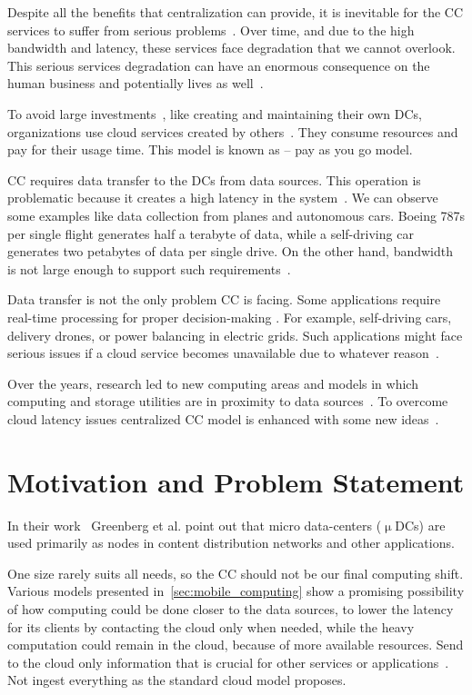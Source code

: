 Despite all the benefits that centralization can provide, it is inevitable for the CC services to suffer from serious problems~\cite{KarimIWGSYO16}. Over time, and due to the high bandwidth and latency, these services face degradation that we cannot overlook. This serious services degradation can have an enormous consequence on the human business and potentially lives as well~\cite{El-SayedSPPGML18}. 

To avoid large investments~\cite{MonsalveCC18}, like creating and maintaining their own DCs, organizations use cloud services created by others~\cite{Satyanarayanan17}. They consume resources and pay for their usage time. This model is known as -- pay as you go model.

CC requires data transfer to the DCs from data sources. This operation is problematic because it creates a high latency in the system~\cite{HossainRH18}. We can observe some examples like data collection from planes and autonomous cars. Boeing 787s per single flight generates half a terabyte of data, while a self-driving car generates two petabytes of data per single drive. On the other hand, bandwidth is not large enough to support such requirements~\cite{CaoZS18}. 

Data transfer is not the only problem CC is facing. Some applications require real-time processing for proper decision-making \cite{CaoZS18}. For example, self-driving cars, delivery drones, or power balancing in electric grids. Such applications might face serious issues if a cloud service becomes unavailable due to whatever reason~\cite{GunawiHSLSAE16}.

Over the years, research led to new computing areas and models in which computing and storage utilities are in proximity to data sources~\cite{Satyanarayanan17}. To overcome cloud latency issues centralized CC model is enhanced with some new ideas~\cite{NingLSY20}.
%
%
\section{Motivation and Problem Statement}\label{sec:problem_statement}
%
In their work~\cite{GreenbergHMP09} Greenberg et al. point out that micro data-centers ($\upmu$DCs) are used primarily as nodes in content distribution networks and other  applications.

One size rarely suits all needs, so the CC should not be our final computing shift. Various models presented in~\ref{sec:mobile_computing} show a promising possibility of how computing could be done closer to the data sources, to lower the latency for its clients by contacting the cloud only when needed, while the heavy computation could remain in the cloud, because of more available resources. Send to the cloud only information that is crucial for other services or applications~\cite{inproceedingsSimic1}. Not ingest everything as the standard cloud model proposes.

